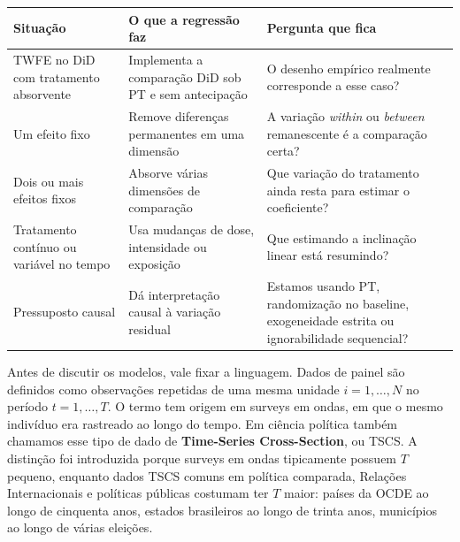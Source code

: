 \documentclass[
]{article}
\begin{document}
\begin{longtable}[]{@{}
  >{\raggedright\arraybackslash}p{}
  >{\raggedright\arraybackslash}p{}
  >{\raggedright\arraybackslash}p{}@{}}
\toprule\noalign{}
\begin{minipage}[b]{\linewidth}\raggedright
Situação
\end{minipage} & \begin{minipage}[b]{\linewidth}\raggedright
O que a regressão faz
\end{minipage} & \begin{minipage}[b]{\linewidth}\raggedright
Pergunta que fica
\end{minipage} \\
\midrule\noalign{}
\endhead
\bottomrule\noalign{}
\endlastfoot
TWFE no DiD com tratamento absorvente & Implementa a comparação DiD sob PT e sem antecipação & O desenho empírico realmente corresponde a esse caso? \\
Um efeito fixo & Remove diferenças permanentes em uma dimensão & A variação \emph{within} ou \emph{between} remanescente é a comparação certa? \\
Dois ou mais efeitos fixos & Absorve várias dimensões de comparação & Que variação do tratamento ainda resta para estimar o coeficiente? \\
Tratamento contínuo ou variável no tempo & Usa mudanças de dose, intensidade ou exposição & Que estimando a inclinação linear está resumindo? \\
Pressuposto causal & Dá interpretação causal à variação residual & Estamos usando PT, randomização no baseline, exogeneidade estrita ou ignorabilidade sequencial? \\
\end{longtable}

Antes de discutir os modelos, vale fixar a linguagem. Dados de painel são definidos como observações repetidas de uma mesma unidade \(i = 1, \ldots, N\) no período \(t = 1, \ldots, T\). O termo tem origem em surveys em ondas, em que o mesmo indivíduo era rastreado ao longo do tempo. Em ciência política também chamamos esse tipo de dado de \textbf{Time-Series Cross-Section}, ou TSCS. A distinção foi introduzida porque surveys em ondas tipicamente possuem \(T\) pequeno, enquanto dados TSCS comuns em política comparada, Relações Internacionais e políticas públicas costumam ter \(T\) maior: países da OCDE ao longo de cinquenta anos, estados brasileiros ao longo de trinta anos, municípios ao longo de várias eleições.
\end{document}
